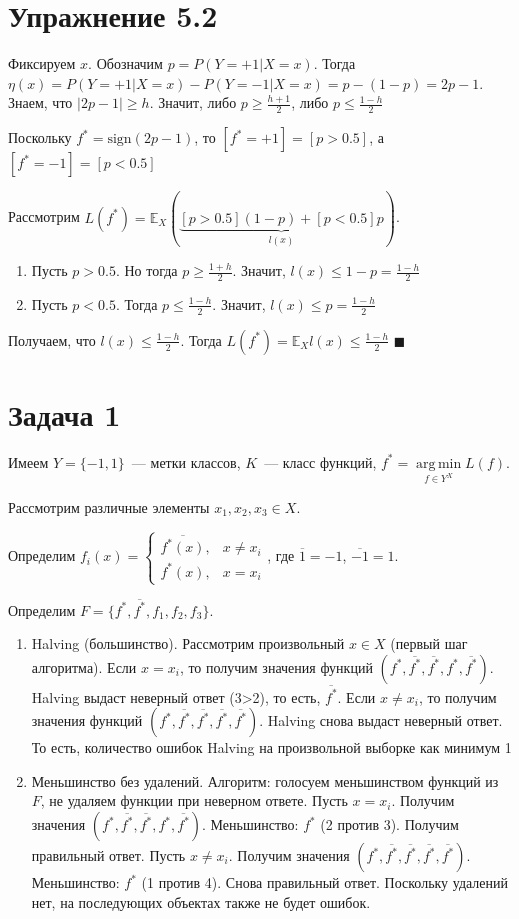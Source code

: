 \documentclass[a4paper]{article}
\DeclareMathOperator*{\argmin}{arg\,min}
\begin{document}
\section*{Упражнение 5.2}
Фиксируем $x$. Обозначим $p=P(Y=+1|X=x)$. Тогда $\eta(x)=P(Y=+1|X=x)-P(Y=-1|X=x)=p-(1-p)=2p-1$. Знаем, что $|2p-1|\geqslant h$. Значит, либо $p\geqslant\frac{h+1}{2}$, либо $p\leqslant \frac{1-h}{2}$

Поскольку $f^*=\mbox{sign}(2p-1)$, то $[f^*=+1]=[p>0.5]$, а $[f^*=-1]=[p<0.5]$

Рассмотрим $L(f^*)=\mathbb{E}_X\left(\underbrace{[p>0.5](1-p)+[p<0.5]p}_{l(x)}\right)$.

\begin{enumerate}
\item Пусть $p>0.5$. Но тогда $p\geqslant \frac{1+h}{2}$. Значит, $l(x)\leqslant 1-p=\frac{1-h}{2}$
\item Пусть $p<0.5$. Тогда $p\leqslant \frac{1-h}{2}$. Значит, $l(x)\leqslant p=\frac{1-h}{2}$
\end{enumerate}

Получаем, что $l(x)\leqslant \frac{1-h}{2}$. Тогда $L(f^*)=\mathbb{E}_Xl(x)\leqslant \frac{1-h}{2}$ $\blacksquare$
\section*{Задача 1}
Имеем $Y=\{-1,1\}$~--- метки классов, $K$~--- класс функций, $f^*=\argmin\limits_{f\in Y^X} L(f)$.

Рассмотрим различные элементы $x_1,x_2,x_3\in X$.

Определим $f_i(x)=\begin{cases}
\overline{f^*(x)},&x\neq x_i\\
f^*(x),&x=x_i
\end{cases}$, где $\overline{1}=-1$, $\overline{-1}=1$.

Определим $F=\{f^*, \overline{f^*}, f_1, f_2, f_3\}$.

\begin{enumerate}
\item Halving (большинство). Рассмотрим произвольный $x\in X$ (первый шаг алгоритма). Если $x=x_i$, то получим значения функций $(f^*, \overline{f^*}, \overline{f^*},f^*,\overline{f^*})$. Halving выдаст неверный ответ (3>2), то есть, $\overline{f^*}$. Если $x\neq x_i$, то получим значения функций $(f^*, \overline{f^*}, \overline{f^*},\overline{f^*},\overline{f^*})$. Halving снова выдаст неверный ответ. То есть, количество ошибок Halving на произвольной выборке как минимум 1
\item Меньшинство без удалений. Алгоритм: голосуем меньшинством функций из $F$, не удаляем функции при неверном ответе. Пусть $x=x_i$. Получим значения $(f^*, \overline{f^*}, \overline{f^*},f^*,\overline{f^*})$. Меньшинство: $f^*$ (2 против 3). Получим правильный ответ. Пусть $x\neq x_i$. Получим значения $(f^*, \overline{f^*}, \overline{f^*},\overline{f^*},\overline{f^*})$. Меньшинство: $f^*$ (1 против 4). Снова правильный ответ. Поскольку удалений нет, на последующих объектах также не будет ошибок.
\end{enumerate}
\end{document}
